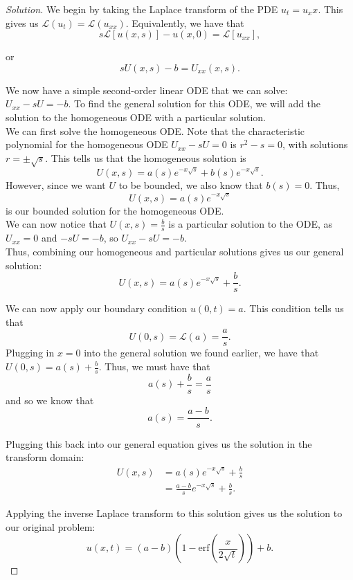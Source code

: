 \documentclass[11pt]{article}
\newenvironment{solution}
  {\renewcommand\qedsymbol{$\blacksquare$}\begin{proof}[Solution]}
  {\end{proof}}
\begin{document}
\begin{solution}
We begin by taking the Laplace transform of the PDE $u_t = u_xx.$ This gives us $ \mathcal{L}(u_t) = \mathcal{L}(u_{xx}).$ Equivalently, we have that
\[ s\mathcal{L}[u(x, s)] - u(x, 0) = \mathcal{L}[u_{xx}],\]

or \[sU(x, s) - b = U_{xx}(x, s).\]

We now have a simple second-order linear ODE that we can solve: $U_{xx} - sU = -b.$ To find the general solution for this ODE, we will add the solution to the homogeneous ODE with a particular solution. \\

We can first solve the homogeneous ODE. Note that the characteristic polynomial for the homogeneous ODE  $U_{xx} - sU = 0$ is $r^2 - s =0$, with solutions $r = \pm \sqrt{s}.$ This tells us that the homogeneous solution is \[U(x, s) = a(s)e^{-x\sqrt{s}} + b(s)e^{-x\sqrt{s}}.\]
However, since we want $U$ to be bounded, we also know that $b(s) = 0$. Thus, \[U(x, s) = a(s)e^{-x\sqrt{s}}\] is our bounded solution for the homogeneous ODE. \\

We can now notice that $U(x, s) = \frac{b}{s}$ is a particular solution to the ODE, as $U_{xx} = 0$ and $-sU = -b$, so $U_{xx} - sU = -b.$ \\

Thus, combining our homogeneous and particular solutions gives us our general solution:
\[ U(x, s) = a(s)e^{-x\sqrt{s}} + \frac{b}{s}. \]

We can now apply our boundary condition $u(0, t) = a.$ This condition tells us that \[U(0, s) = \mathcal{L}(a) = \frac{a}{s}.\]
Plugging in $x=0$ into the general solution we found earlier, we have that $U(0, s) = a(s) + \frac{b}{s}$. Thus, we must have that
\[a(s) + \frac{b}{s} = \frac{a}{s} \]
and so we know that \[a(s) = \frac{a-b}{s}.\]

Plugging this back into our general equation gives us the solution in the transform domain:
\begin{align*} U(x, s) &= a(s)e^{-x\sqrt{s}} + \frac{b}{s} \\ &= \frac{a-b}{s}e^{-x\sqrt{s}} + \frac{b}{s}.\end{align*}

Applying the inverse Laplace transform to this solution gives us the solution to our original problem:
\[\boxed{u(x, t) = (a-b)\left( 1 - \mathrm{erf}\left( \frac{x}{2\sqrt{t}}\right)\right) + b}.\]
\end{solution}
\end{document}

